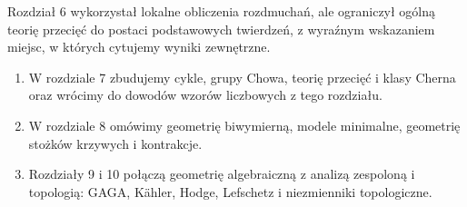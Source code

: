 \begin{uwaga}
Rozdział 6 wykorzystał lokalne obliczenia rozdmuchań,
ale ograniczył ogólną teorię przecięć do postaci
podstawowych twierdzeń, z wyraźnym wskazaniem miejsc,
w których cytujemy wyniki zewnętrzne.
\begin{enumerate}[label=(\roman*)]
\item W rozdziale 7 zbudujemy cykle, grupy Chowa,
      teorię przecięć i klasy Cherna oraz wrócimy
      do dowodów wzorów liczbowych z tego rozdziału.
\item W rozdziale 8 omówimy geometrię biwymierną,
      modele minimalne, geometrię stożków krzywych
      i kontrakcje.
\item Rozdziały 9 i 10 połączą geometrię algebraiczną
      z analizą zespoloną i topologią: GAGA, Kähler,
      Hodge, Lefschetz i niezmienniki topologiczne.
\end{enumerate}
\end{uwaga}




